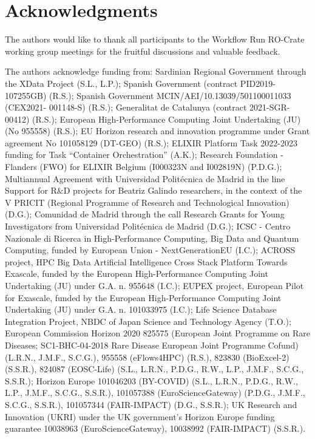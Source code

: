 \documentclass[10pt,letterpaper]{article}
\begin{document}
\section*{Acknowledgments}

The authors would like to thank all participants to the Workflow Run
RO-Crate working group meetings for the fruitful discussions and
valuable feedback.

\iftrue
The authors acknowledge funding from: 
  Sardinian Regional Government through the XData Project (S.L., L.P.);
  Spanish Government (contract PID2019-107255GB) (R.S.);
  Spanish Government MCIN/AEI/10.13039/501100011033 (CEX2021- 001148-S) (R.S.);
  Generalitat de Catalunya (contract 2021-SGR-00412) (R.S.);
  European High-Performance Computing Joint Undertaking (JU) (No 955558) (R.S.);
  EU Horizon research and innovation programme under Grant agreement No 101058129 (DT-GEO) (R.S.);
  ELIXIR Platform Task 2022-2023 funding for Task ``Container
  Orchestration'' (A.K.);
  Research Foundation - Flanders (FWO) for ELIXIR Belgium (I000323N and I002819N) (P.D.G.);
  Multiannual Agreement with Universidad Politécnica de Madrid in the line Support for R\&D projects for Beatriz Galindo researchers, in the context of the V PRICIT (Regional Programme of Research and Technological Innovation) (D.G.);
  Comunidad de Madrid through the call Research Grants for Young Investigators from Universidad Politécnica de Madrid (D.G.);
  ICSC - Centro Nazionale di Ricerca in High-Performance Computing, Big Data and Quantum Computing, funded by European Union - NextGenerationEU (I.C.);
  ACROSS project, HPC Big Data Artificial Intelligence Cross Stack Platform Towards Exascale, funded by the European High-Performance Computing Joint Undertaking (JU) under G.A. n. 955648 (I.C.);
  EUPEX project, European Pilot for Exascale, funded by the European High-Performance Computing Joint Undertaking (JU) under G.A. n. 101033975 (I.C.);
  Life Science Database Integration Project, NBDC of Japan Science and
  Technology Agency (T.O.);
  European Commission Horizon 2020 
  825575 (European Joint Programme on Rare Diseases; SC1-BHC-04-2018 Rare Disease European Joint Programme Cofund) (L.R.N., J.M.F., S.C.G.),
  955558 (eFlows4HPC) (R.S.),
  823830
  (BioExcel-2) (S.S.R.), 
  824087
  (EOSC-Life) (S.L., L.R.N., P.D.G., R.W., L.P., J.M.F., S.C.G., S.S.R.);
  Horizon Europe 
  101046203 (BY-COVID) (S.L., L.R.N., P.D.G., R.W., L.P., J.M.F., S.C.G., S.S.R.),
  101057388 (EuroScienceGateway) (P.D.G., J.M.F., S.C.G., S.S.R.),
  101057344 (FAIR-IMPACT) (D.G., S.S.R.);
  UK Research and Innovation (UKRI) under the UK government's Horizon
  Europe funding guarantee 
  10038963 (EuroScienceGateway), 
  10038992 (FAIR-IMPACT) (S.S.R.).
\end{document}
